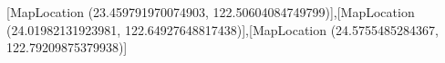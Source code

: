[MapLocation (23.459791970074903, 122.50604084749799)],[MapLocation (24.01982131923981, 122.64927648817438)],[MapLocation (24.5755485284367, 122.79209875379938)]